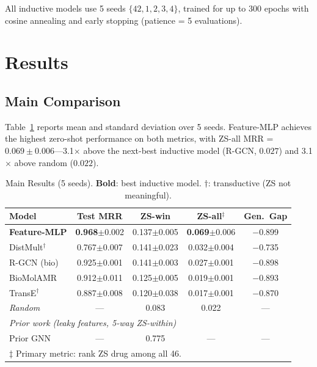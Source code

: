 \documentclass[conference]{IEEEtran}
\begin{document}
All inductive models use 5 seeds $\{42, 1, 2, 3, 4\}$, trained for up to
300 epochs with cosine annealing and early stopping (patience = 5 evaluations).

\section{Results}
\label{sec:results}

\subsection{Main Comparison}
\label{sec:main}

Table~\ref{tab:main} reports mean and standard deviation over 5 seeds.
Feature-MLP achieves the highest zero-shot performance on both metrics,
with ZS-all MRR = $0.069 \pm 0.006$---3.1$\times$ above the next-best inductive
model (R-GCN, $0.027$) and 3.1$\times$ above random ($0.022$).

\begin{table}[t]
\centering
\caption{Main Results (5 seeds). \textbf{Bold}: best inductive model.
$\dagger$: transductive (ZS not meaningful).}
\label{tab:main}
\begin{tabular}{lcccc}
\toprule
\textbf{Model} & \textbf{Test MRR} & \textbf{ZS-win}
  & \textbf{ZS-all}$^\ddagger$ & \textbf{Gen.\ Gap} \\
\midrule
\textbf{Feature-MLP}
  & \textbf{0.968}$\pm$0.002 & 0.137$\pm$0.005
  & \textbf{0.069}$\pm$0.006 & $-$0.899 \\
DistMult$^\dagger$
  & 0.767$\pm$0.007 & 0.141$\pm$0.023
  & 0.032$\pm$0.004 & $-$0.735 \\
R-GCN (bio)
  & 0.925$\pm$0.001 & 0.141$\pm$0.003
  & 0.027$\pm$0.001 & $-$0.898 \\
BioMolAMR
  & 0.912$\pm$0.011 & 0.125$\pm$0.005
  & 0.019$\pm$0.001 & $-$0.893 \\
TransE$^\dagger$
  & 0.887$\pm$0.008 & 0.120$\pm$0.038
  & 0.017$\pm$0.001 & $-$0.870 \\
\midrule
\textit{Random}
  & — & 0.083 & 0.022 & — \\
\midrule
\multicolumn{5}{l}{\textit{Prior work (leaky features, 5-way ZS-within)}} \\
Prior GNN~\cite{prior_work}
  & — & 0.775 & — & — \\
\bottomrule
\multicolumn{5}{l}{\small $\ddagger$ Primary metric: rank ZS drug among all 46.}
\end{tabular}
\end{table}
\end{document}
